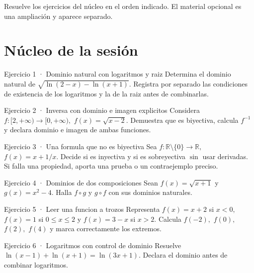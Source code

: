 \documentclass[10pt,a4paper,oneside,openany]{book}
\begin{document}
Resuelve los ejercicios del núcleo en el orden indicado. El material opcional es una ampliación y aparece separado.
\section*{Núcleo de la sesión}
\begin{PSevenExerciseFixed}{Ejercicio 1 · Dominio natural con logaritmos y raiz}
Determina el dominio natural de \(\sqrt{\ln(2-x)-\ln(x+1)}\). Registra por separado las condiciones de existencia de los logaritmos y la de la raiz antes de combinarlas.
\end{PSevenExerciseFixed}
\begin{PSevenExerciseFixed}{Ejercicio 2 · Inversa con dominio e imagen explicitos}
Considera \(f:[2,+\infty )\to [0,+\infty ),\) \(f(x)=\sqrt{x-2}\). Demuestra que es biyectiva, calcula \(f^{-1}\) y declara dominio e imagen de ambas funciones.
\end{PSevenExerciseFixed}
\begin{PSevenExerciseFixed}{Ejercicio 3 · Una formula que no es biyectiva}
Sea \(f:\mathbb{R}\setminus \{0\}\to \mathbb{R},\) \(f(x)=x+1/x\). Decide si es inyectiva y si es sobreyectiva \(\sin\) usar derivadas. Si falla una propiedad, aporta una prueba o un contraejemplo preciso.
\end{PSevenExerciseFixed}
\begin{PSevenExerciseFixed}{Ejercicio 4 · Dominios de dos composiciones}
Sean \(f(x)=\sqrt{x+1}\) y \(g(x)=x^{2}-4\). Halla \(f\circ g\) y \(g\circ f\) con sus dominios naturales.
\end{PSevenExerciseFixed}
\begin{PSevenExerciseFixed}{Ejercicio 5 · Leer una funcion a trozos}
Representa \(f(x)=x+2\) si \(x<0,\) \(f(x)=1\) si \(0\le x\le 2\) y \(f(x)=3-x\) si \(x>2\). Calcula \(f(-2),\) \(f(0),\) \(f(2),\) \(f(4)\) y marca correctamente los extremos.
\end{PSevenExerciseFixed}
\begin{PSevenExerciseFixed}{Ejercicio 6 · Logaritmos con control de dominio}
Resuelve \(\ln(x-1)+\ln(x+1)=\ln(3x+1)\). Declara el dominio antes de combinar logaritmos.
\end{PSevenExerciseFixed}
\end{document}
